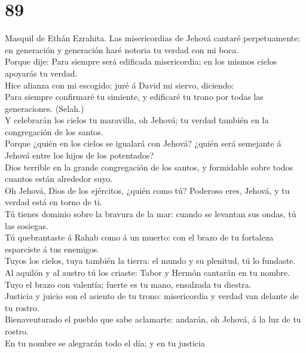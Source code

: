 \hypertarget{section-88}{%
\section{89}\label{section-88}}

 Masquil de Ethán Ezrahita. Las misericordias de Jehová
cantaré perpetuamente: en generación y generación haré notoria tu verdad
con mi boca.\\
 Porque dije: Para siempre será edificada misericordia; en
los mismos cielos apoyarás tu verdad.\\
 Hice alianza con mi escogido; juré á David mi siervo,
diciendo:\\
 Para siempre confirmaré tu simiente, y edificaré tu trono
por todas las generaciones. (Selah.)\\
 Y celebrarán los cielos tu maravilla, oh Jehová; tu
verdad también en la congregación de los santos.\\
 Porque ¿quién en los cielos se igualará con Jehová?
¿quién será semejante á Jehová entre los hijos de los potentados?\\
 Dios terrible en la grande congregación de los santos, y
formidable sobre todos cuantos están alrededor suyo.\\
 Oh Jehová, Dios de los ejércitos, ¿quién como tú?
Poderoso eres, Jehová, y tu verdad está en torno de ti.\\
 Tú tienes dominio sobre la bravura de la mar: cuando se
levantan sus ondas, tú las sosiegas.\\
 Tú quebrantaste á Rahab como á un muerto: con el brazo
de tu fortaleza esparciste á tus enemigos.\\
 Tuyos los cielos, tuya también la tierra: el mundo y su
plenitud, tú lo fundaste.\\
 Al aquilón y al austro tú los criaste: Tabor y Hermón
cantarán en tu nombre.\\
 Tuyo el brazo con valentía; fuerte es tu mano, ensalzada
tu diestra.\\
 Justicia y juicio son el asiento de tu trono:
misericordia y verdad van delante de tu rostro.\\
 Bienaventurado el pueblo que sabe aclamarte: andarán, oh
Jehová, á la luz de tu rostro.\\
 En tu nombre se alegrarán todo el día; y en tu justicia
